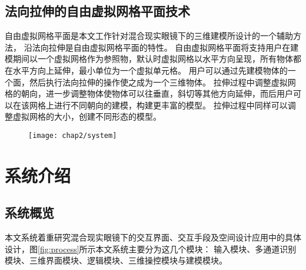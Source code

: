 \subsection{法向拉伸的自由虚拟网格平面技术}
自由虚拟网格平面是本文工作针对混合现实眼镜下的三维建模所设计的一个辅助方法，
沿法向拉伸是自由虚拟网格平面的特性。
自由虚拟网格平面将支持用户在建模期间以一个虚拟网格作为参照物，默认时虚拟网格以水平方向呈现，所有物体都在水平方向上延伸，最小单位为一个虚拟单元格。
用户可以通过先建模物体的一个面，然后执行法向拉伸的操作使之成为一个三维物体。
拉伸过程中调整虚拟网格的朝向，进一步调整物体使物体可以往垂直，斜切等其他方向延伸，而后用户可以在该网格上进行不同朝向的建模，构建更丰富的模型。
拉伸过程中同样可以调整虚拟网格的大小，创建不同形态的模型。

\begin{figure}[!htp]
  \centering
  \texttt{[image: chap2/system]}
\end{figure}

\section{系统介绍}
\subsection{系统概览}
本文系统着重研究混合现实眼镜下的交互界面、交互手段及空间设计应用中的具体设计，图\ref{fig:process}所示本文系统主要分为这几个模块：
输入模块、多通道识别模块、三维界面模块、逻辑模块、三维操控模块与建模模块。


\begin{figure}[!htpb]
	\centering
	\subfigure{\label{fig:chessboard:1}}\addtocounter{subfigure}{-2}
	\subfigure{\label{fig:chessboard:2}}\addtocounter{subfigure}{-2}
	\subfigure{\label{fig:chessboard:3}}\addtocounter{subfigure}{-2}
	\subfigure{\label{fig:chessboard:4}}\addtocounter{subfigure}{-2}
	\vspace{-1em}
\end{figure}

